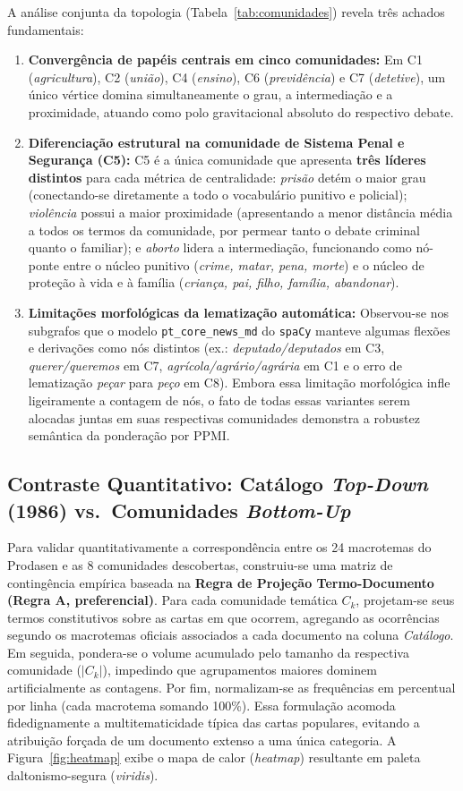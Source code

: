 \documentclass[12pt]{article}
\begin{document}
A análise conjunta da topologia (Tabela~\ref{tab:comunidades}) revela três achados fundamentais:
\begin{enumerate}
    \item \textbf{Convergência de papéis centrais em cinco comunidades:} Em C1 (\textit{agricultura}), C2 (\textit{união}), C4 (\textit{ensino}), C6 (\textit{previdência}) e C7 (\textit{detetive}), um único vértice domina simultaneamente o grau, a intermediação e a proximidade, atuando como polo gravitacional absoluto do respectivo debate.
    \item \textbf{Diferenciação estrutural na comunidade de Sistema Penal e Segurança (C5):} C5 é a única comunidade que apresenta \textbf{três líderes distintos} para cada métrica de centralidade: \textit{prisão} detém o maior grau (conectando-se diretamente a todo o vocabulário punitivo e policial); \textit{violência} possui a maior proximidade (apresentando a menor distância média a todos os termos da comunidade, por permear tanto o debate criminal quanto o familiar); e \textit{aborto} lidera a intermediação, funcionando como nó-ponte entre o núcleo punitivo (\textit{crime, matar, pena, morte}) e o núcleo de proteção à vida e à família (\textit{criança, pai, filho, família, abandonar}).
    \item \textbf{Limitações morfológicas da lematização automática:} Observou-se nos subgrafos que o modelo \texttt{pt\_core\_news\_md} do \texttt{spaCy} manteve algumas flexões e derivações como nós distintos (ex.: \textit{deputado/deputados} em C3, \textit{querer/queremos} em C7, \textit{agrícola/agrário/agrária} em C1 e o erro de lematização \textit{peçar} para \textit{peço} em C8). Embora essa limitação morfológica infle ligeiramente a contagem de nós, o fato de todas essas variantes serem alocadas juntas em suas respectivas comunidades demonstra a robustez semântica da ponderação por PPMI.
\end{enumerate}

\subsection{Contraste Quantitativo: Catálogo \textit{Top-Down} (1986) vs.\ Comunidades \textit{Bottom-Up}}

Para validar quantitativamente a correspondência entre os 24 macrotemas do Prodasen e as 8 comunidades descobertas, construiu-se uma matriz de contingência empírica baseada na \textbf{Regra de Projeção Termo-Documento (Regra A, preferencial)}. Para cada comunidade temática $C_k$, projetam-se seus termos constitutivos sobre as cartas em que ocorrem, agregando as ocorrências segundo os macrotemas oficiais associados a cada documento na coluna \textit{Catálogo}. Em seguida, pondera-se o volume acumulado pelo tamanho da respectiva comunidade ($|C_k|$), impedindo que agrupamentos maiores dominem artificialmente as contagens. Por fim, normalizam-se as frequências em percentual por linha (cada macrotema somando 100\%). Essa formulação acomoda fidedignamente a multitematicidade típica das cartas populares, evitando a atribuição forçada de um documento extenso a uma única categoria. A Figura~\ref{fig:heatmap} exibe o mapa de calor (\textit{heatmap}) resultante em paleta daltonismo-segura (\textit{viridis}).
\end{document}
